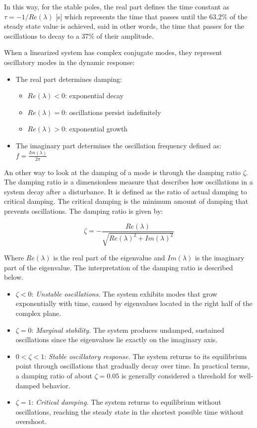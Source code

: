 In this way, for the stable poles, the real part defines the time constant as $\tau = -1/ Re(\lambda) $ [s] which represents the time that passes until
the 63,2\% of the steady state value is achieved, said in other words, the time that passes for the oscillations to decay to a 37\% of their amplitude.

When a linearized system has complex conjugate modes, they represent oscillatory modes in the dynamic response:

\begin{itemize}
  \item The real part determines damping:
  \begin{itemize}
    \item $Re(\lambda) < 0$: exponential decay
    \item $Re(\lambda) = 0$: oscillations persist indefinitely
    \item $Re(\lambda) > 0$: exponential growth
  \end{itemize}
  \item The imaginary part determines the oscillation frequency defined as: $f = \frac{Im(\lambda)}{2\pi}$
\end{itemize}

An other way to look at the damping of a mode is through the damping ratio $\zeta$. The damping ratio is a dimensionless measure that describes how oscillations 
in a system decay after a disturbance. It is defined as the ratio of actual damping to critical damping. The critical damping is the minimum amount of damping that prevents oscillations. 
The damping ratio is given by: 

\begin{equation}
  \zeta = -  \frac{Re(\lambda)}{\sqrt{Re(\lambda)^2+Im(\lambda)^2}}
\end{equation}

Where $Re(\lambda)$ is the real part of the eigenvalue and $Im(\lambda)$ is the imaginary part of the eigenvalue. The interpretation of the damping ratio is described below.

\begin{itemize}
  \item $\zeta < 0$: \textit{Unstable oscillations.} The system exhibits modes that grow exponentially with time, caused by eigenvalues located in the right half of the complex plane.
  \item $\zeta = 0$: \textit{Marginal stability.} The system produces undamped, sustained oscillations since the eigenvalues lie exactly on the imaginary axis.
  \item $0 < \zeta < 1$: \textit{Stable oscillatory response.} The system returns to its equilibrium point through oscillations that gradually decay over time. 
  In practical terms, a damping ratio of about $\zeta = 0.05$ is generally considered a threshold for well-damped behavior.
  \item $\zeta = 1$: \textit{Critical damping.} The system returns to equilibrium without oscillations, reaching the steady state in the shortest possible time without overshoot.
\end{itemize}

